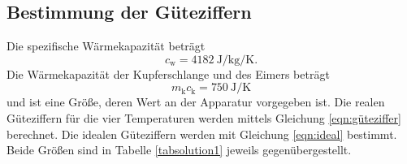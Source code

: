 \subsection{Bestimmung der Güteziffern}
Die spezifische Wärmekapazität \cite{wiki} beträgt
\begin{equation*}
    c_\text{w} = \SI{4182}{\joule\per\kilo\gram\per\kelvin}.
\end{equation*}
Die Wärmekapazität der Kupferschlange und des Eimers beträgt
\begin{equation*}
    m_\text{k} c_\text{k} = \SI{750}{\joule\per\kelvin}
\end{equation*}
und ist eine Größe, deren Wert an der Apparatur vorgegeben ist.
Die realen Güteziffern für die vier Temperaturen werden mittels
Gleichung \eqref{eqn:güteziffer} berechnet.
Die idealen Güteziffern werden mit Gleichung \eqref{eqn:ideal}
bestimmt.
Beide Größen sind in Tabelle \ref{tabsolution1} jeweils
gegenübergestellt.


